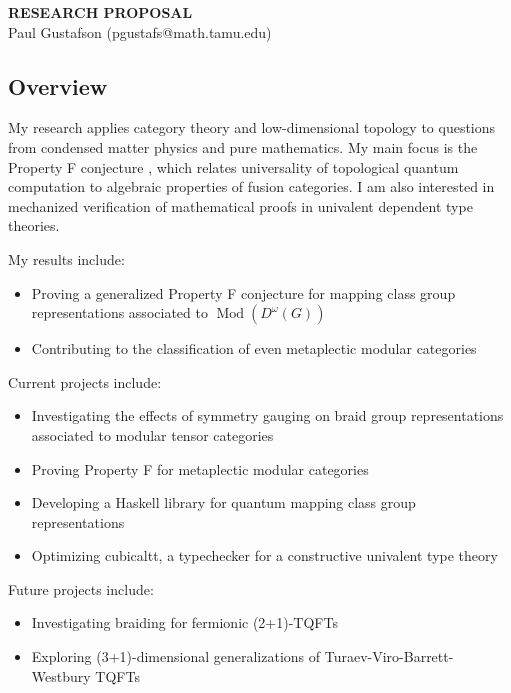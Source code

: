 \documentclass[12pt]{article}
\DeclareMathOperator{\Mod}{Mod}
\theoremstyle{plain} \numberwithin{equation}{section}
\theoremstyle{definition}
\begin{document}
\begin{center}
{\bf RESEARCH PROPOSAL}\\
\vspace*{0.1cm}
{\normalsize Paul Gustafson (pgustafs@math.tamu.edu)}
\end{center}




\subsection*{Overview}

My research applies category theory and low-dimensional topology to questions from condensed matter physics and pure mathematics.   My main focus is the Property F conjecture \cite{nr}, which relates universality of topological quantum computation to algebraic properties of fusion categories. I am also interested in mechanized verification of mathematical proofs in univalent dependent type theories.

My results include: %
\begin{itemize}
\item Proving a generalized Property F conjecture for mapping class group representations associated to $\Mod(D^\omega(G))$ \cite{g}
\item Contributing to the classification of even metaplectic modular categories \cite{bgpr}
\end{itemize}
  
Current projects include:    %
\begin{itemize}
\item Investigating the effects of symmetry gauging on braid group representations associated to modular tensor categories
\item Proving Property F for metaplectic modular categories
\item Developing a Haskell library for quantum mapping class group representations
\item Optimizing cubicaltt, a typechecker for a constructive univalent type theory
\end{itemize}

Future projects include:
\begin{itemize}
  \item Investigating braiding for fermionic (2+1)-TQFTs \cite{walker}
  \item Exploring (3+1)-dimensional generalizations of Turaev-Viro-Barrett-Westbury TQFTs \cite{cui}
\end{itemize}
\end{document}

